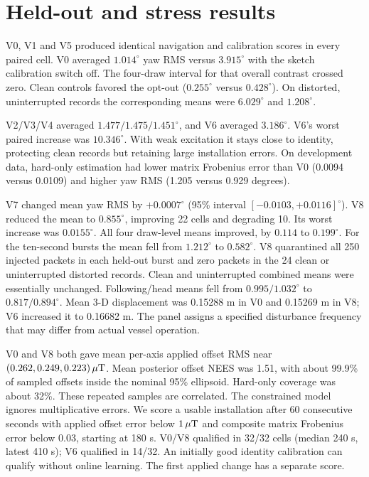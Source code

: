 \section{Held-out and stress results}
V0, V1 and V5 produced identical navigation and calibration scores in every paired cell. V0 averaged $1.014^\circ$ yaw RMS versus $3.915^\circ$ with the sketch calibration switch off. The four-draw interval for that overall contrast crossed zero. Clean controls favored the opt-out ($0.255^\circ$ versus $0.428^\circ$). On distorted, uninterrupted records the corresponding means were $6.029^\circ$ and $1.208^\circ$.

V2/V3/V4 averaged $1.477/1.475/1.451^\circ$, and V6 averaged $3.186^\circ$. V6's worst paired increase was $10.346^\circ$. With weak excitation it stays close to identity, protecting clean records but retaining large installation errors. On development data, hard-only estimation had lower matrix Frobenius error than V0 (0.0094 versus 0.0109) and higher yaw RMS (1.205 versus 0.929 degrees).

V7 changed mean yaw RMS by $+0.0007^\circ$ (95\% interval $[-0.0103,+0.0116]^\circ$). V8 reduced the mean to $0.855^\circ$, improving 22 cells and degrading 10. Its worst increase was $0.0155^\circ$. All four draw-level means improved, by $0.114$ to $0.199^\circ$. For the ten-second bursts the mean fell from $1.212^\circ$ to $0.582^\circ$. V8 quarantined all 250 injected packets in each held-out burst and zero packets in the 24 clean or uninterrupted distorted records. Clean and uninterrupted combined means were essentially unchanged. Following/head means fell from $0.995/1.032^\circ$ to $0.817/0.894^\circ$. Mean 3-D displacement was 0.15288 m in V0 and 0.15269 m in V8; V6 increased it to 0.16682 m. The panel assigns a specified disturbance frequency that may differ from actual vessel operation.

V0 and V8 both gave mean per-axis applied offset RMS near $(0.262,0.249,0.223)\,\mu\mathrm T$. Mean posterior offset NEES was 1.51, with about 99.9\% of sampled offsets inside the nominal 95\% ellipsoid. Hard-only coverage was about 32\%. These repeated samples are correlated. The constrained model ignores multiplicative errors. We score a usable installation after 60 consecutive seconds with applied offset error below $1\,\mu\mathrm T$ and composite matrix Frobenius error below 0.03, starting at 180 s. V0/V8 qualified in 32/32 cells (median 240 s, latest 410 s); V6 qualified in 14/32. An initially good identity calibration can qualify without online learning. The first applied change has a separate score.

